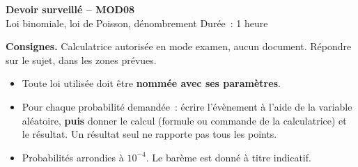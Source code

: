 \documentclass[a4paper,11pt]{article}
\begin{document}
\begin{tcolorbox}[colback=uimmred, colframe=uimmred, sharp corners, boxrule=0pt,
  left=14pt, right=14pt, top=10pt, bottom=10pt]
{\color{white}\LARGE\bfseries Devoir surveillé -- MOD08}\\[4pt]
{\color{white}\large Loi binomiale, loi de Poisson, dénombrement \hfill Durée~: 1 heure}
\end{tcolorbox}

\vspace{2pt}

\begin{consigne}
\textbf{Consignes.} Calculatrice autorisée en mode examen, aucun document. Répondre sur le sujet, dans les zones prévues.
\begin{itemize}[leftmargin=12pt, itemsep=1pt, topsep=2pt]
  \item Toute loi utilisée doit être \textbf{nommée avec ses paramètres}.
  \item Pour chaque probabilité demandée~: écrire l'évènement à l'aide de la variable aléatoire, \textbf{puis} donner le calcul (formule ou commande de la calculatrice) et le résultat. Un résultat seul ne rapporte pas tous les points.
  \item Probabilités arrondies à $10^{-4}$. Le barème est donné à titre indicatif.
\end{itemize}
\end{consigne}
\end{document}
